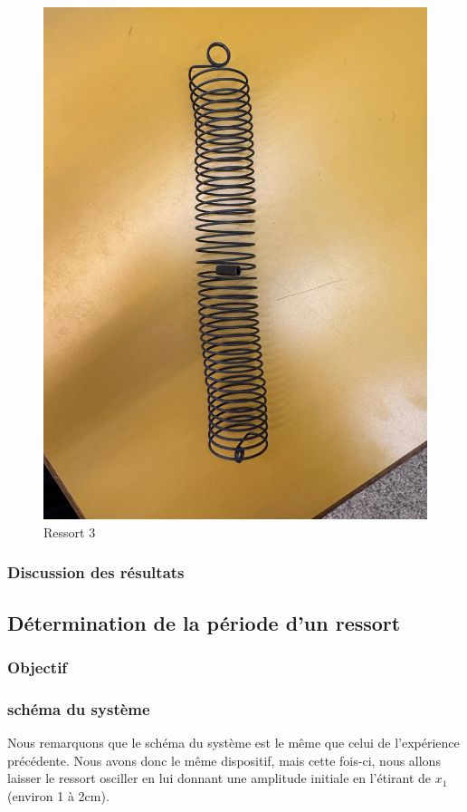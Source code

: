 \begin{figure}[h]
\begin{minipage}{0.32\textwidth}
                    \includegraphics[width=\linewidth]{images/res3.jpeg}
                    \caption{Ressort 3}
                \end{minipage}
            \end{figure}
        \subsubsection{Discussion des résultats}
    \subsection{Détermination de la période d'un ressort}
        \subsubsection{Objectif}
        
        \subsubsection{schéma du système}
            
            Nous remarquons que le schéma du système est le même que celui de l'expérience précédente.
            Nous avons donc le même dispositif, mais cette fois-ci, nous allons laisser le ressort
            osciller en lui donnant une amplitude initiale en l'étirant de $x_1$ (environ 1 à 2cm).

